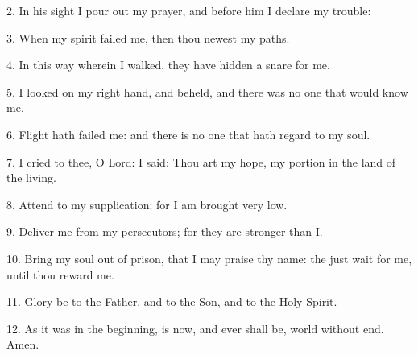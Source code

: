 2. In his sight I pour out my prayer, and before him I declare my trouble:
	
3. When my spirit failed me, then thou newest my paths. 

4. In this way wherein I walked, they have hidden a snare for me.

5. I looked on my right hand, and beheld, and there was no one that would know me. 

6. Flight hath failed me: and there is no one that hath regard to my soul.

7. I cried to thee, O Lord: I said: Thou art my hope, my portion in the land of the living.

8. Attend to my supplication: for I am brought very low. 

9. Deliver me from my persecutors; for they are stronger than I.

10. Bring my soul out of prison, that I may praise thy name: the just wait for me, until thou reward me.

11. Glory be to the Father, and to the Son, and to the Holy Spirit.
 	
12. As it was in the beginning, is now, and ever shall be, world without end. Amen.